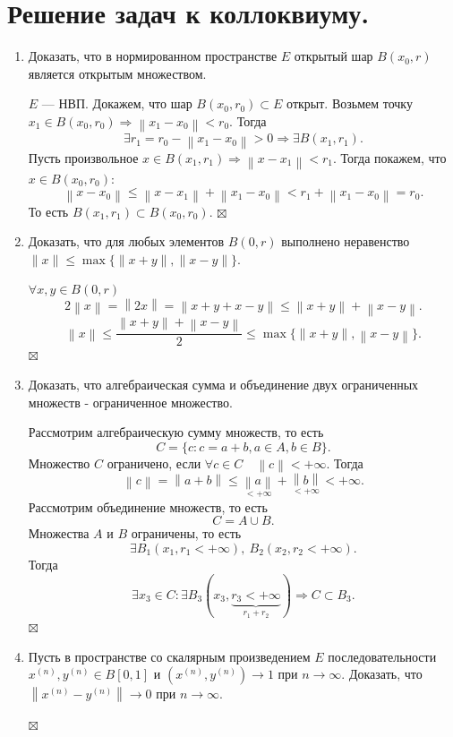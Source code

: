\documentclass[a4paper, 12pt]{report}
\newenvironment{Proof} %
{\par\noindent{$\blacklozenge$}} %
{\hfill$\scriptstyle\boxtimes$}
\renewcommand{\leq}{\leqslant}
\newcommand\Norm[1]{\left\| #1 \right\|}
\begin{document}
	\section*{Решение задач к коллоквиуму.}
	\begin{enumerate}
		\item Доказать, что в нормированном пространстве $E$ открытый шар $B\left(x_{0}, r\right)$ является открытым множеством.
		\begin{Proof}
			$E$ --- НВП. Докажем, что шар $B(x_0,r_0)\subset E$ открыт. Возьмем точку $x_1 \in B(x_0,r_0) \Rightarrow \Norm{x_1-x_0} < r_0.$
		Тогда $$\exists r_1 = r_0-\Norm{x_1-x_0} > 0\Rightarrow \exists B(x_1, r_1).$$
		Пусть произвольное $x\in B(x_1,r_1) \Rightarrow \Norm{x-x_1} < r_1$. Тогда покажем, что $x \in B(x_0,r_0):$ $$\Norm{x-x_0}\leq \Norm{x-x_1}+\Norm{x_1-x_0}<r_1 + \Norm{x_1 - x_0} = r_0.$$
		То есть $B(x_1,r_1)\subset B(x_0,r_0)$.
		\end{Proof}
		\item Доказать, что для любых элементов $B(0, r)$ выполнено неравенство $\|x\| \leqslant \max \{\|x+y\|,\|x-y\|\}$.
		\begin{Proof}
			$\forall x,y \in B(0,r)$ $$2\Norm{x} = \Norm{2x} = \Norm{x+y+x-y} \leq \Norm{x+y} + \Norm{x-y}.$$
		$$\Norm{x}\leq \dfrac{ \Norm{x+y} + \Norm{x-y}}{2}\leq \max \{  \Norm{x+y}, \Norm{x-y}\}.$$
		\end{Proof}
		\item Доказать, что алгебраическая сумма и объединение двух ограниченных множеств - ограниченное множество.
		\begin{Proof}
			Рассмотрим алгебраическую сумму множеств, то есть $$C = \{c : c = a+b, a\in A, b \in B\}.$$
		Множество $C$ ограничено, если $\forall c \in C \quad \Norm{c}< +\infty$. Тогда $$\Norm{c} = \Norm{a+b}\leq \underset{<+\infty}{\Norm{a}} + \underset{<+\infty}{\Norm{b}} < +\infty.$$
		Рассмотрим объединение множеств, то есть $$C = A \cup B.$$
		Множества $A$ и $B$ ограничены, то есть $$\exists B_1(x_1, r_1 < +\infty),\ B_2(x_2, r_2< +\infty).$$
		Тогда $$\exists x_3 \in C : \exists B_3(x_3, \underbrace{r_3 < +\infty}_{r_1+r_2})\Rightarrow C \subset B_3.$$
		\end{Proof}
		\item Пусть в пространстве со скалярным произведением $E$ последовательности $x^{(n)}, y^{(n)} \in B[0,1]$ и $\left(x^{(n)}, y^{(n)}\right) \rightarrow 1$ при $n \rightarrow \infty$. Доказать, что $\left\|x^{(n)}-y^{(n)}\right\| \rightarrow 0$ при $n \rightarrow \infty$.
		\begin{Proof}

\end{Proof}
\end{enumerate}
\end{document}
